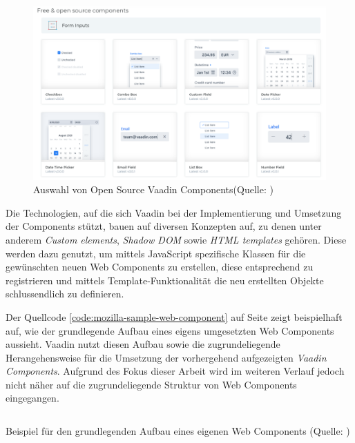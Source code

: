 \documentclass[a4paper,12pt,twoside]{scrreprt}
\begin{document}
\begin{figure}[ht]
    \centering
    \includegraphics[scale=0.38]{images/Vaadin_Components-overview.png}
    \caption[Auswahl von Open Source Vaadin Components]{Auswahl von Open Source Vaadin Components\newline(Quelle: \cite[][]{vaadin_ltd_mobile_nodate})}
    \label{fig:vaadin-components-overview}
\end{figure}

Die Technologien, auf die sich Vaadin bei der Implementierung und Umsetzung der Components stützt, bauen auf diversen Konzepten auf, zu denen unter anderem \textit{Custom elements}, \textit{Shadow \ac{DOM}} sowie \textit{HTML templates} gehören. Diese werden dazu genutzt, um mittels JavaScript spezifische Klassen für die gewünschten neuen Web Components zu erstellen, diese entsprechend zu registrieren und mittels Template-Funktionalität die neu erstellten Objekte schlussendlich zu definieren. \parencite[][]{mozilla_contributors_web_2021}

\medskip

Der Quellcode \ref{code:mozilla-sample-web-component} auf Seite \pageref{code:mozilla-sample-web-component} zeigt beispielhaft auf, wie der grundlegende Aufbau eines eigens umgesetzten Web Components aussieht. Vaadin nutzt diesen Aufbau sowie die zugrundeliegende Herangehensweise für die Umsetzung der vorhergehend aufgezeigten \textit{Vaadin Components}. \parencite[vgl.][]{vaadin_ltd_vaadin-text-fieldjs_2021} Aufgrund des Fokus dieser Arbeit wird im weiteren Verlauf jedoch nicht näher auf die zugrundeliegende Struktur von Web Components eingegangen.

\begin{listing}[ht]
    \inputminted[fontsize=\footnotesize,linenos]{js}{code/Mozilla_Web-Component-sample.js}
    \caption[Beispiel für den grundlegenden Aufbau eines eigenen Web Components]{Beispiel für den grundlegenden Aufbau eines eigenen Web Components (Quelle: \cite[][]{mozilla_contributors_using_2021})}
    \label{code:mozilla-sample-web-component}
\end{listing}
\end{document}
